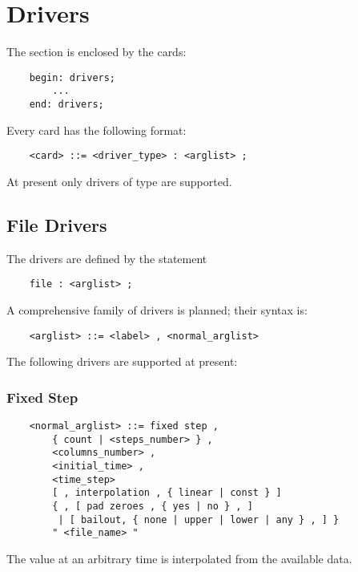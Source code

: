 %
%
%
%
%
% 
%
%

\chapter{Drivers}\label{sec:DRIVERS}
The  section is enclosed by the cards:
\begin{verbatim}
    begin: drivers;
        ...
    end: drivers;
\end{verbatim}
Every  card has the following format:
\begin{verbatim}
    <card> ::= <driver_type> : <arglist> ;
\end{verbatim}
At present only  drivers of type  are supported.

\section{File Drivers}
The  drivers are defined by the statement
\begin{verbatim}
    file : <arglist> ;
\end{verbatim}
A comprehensive family of  drivers is planned;
their syntax is:
\begin{verbatim}
    <arglist> ::= <label> , <normal_arglist>
\end{verbatim}
The following  drivers are supported at present:



\subsection{Fixed Step}
\begin{verbatim}
    <normal_arglist> ::= fixed step , 
        { count | <steps_number> } ,
        <columns_number> ,
        <initial_time> ,
        <time_step> 
        [ , interpolation , { linear | const } ]
        { , [ pad zeroes , { yes | no } , ]
         | [ bailout, { none | upper | lower | any } , ] }
        " <file_name> "
\end{verbatim}
The value at an arbitrary time is interpolated from the available data.

